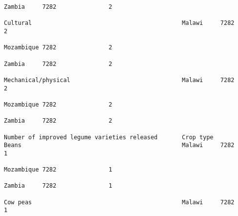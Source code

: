 \documentclass[11pt]{article}
\begin{document}
\begin{Verbatim}[commandchars=\\\{\}]
                                                                                                                                                                                                                 Zambia     7282               2  
                                                                                                                                                              Cultural                                           Malawi     7282               2  
                                                                                                                                                                                                                 Mozambique 7282               2  
                                                                                                                                                                                                                 Zambia     7282               2  
                                                                                                                                                              Mechanical/physical                                Malawi     7282               2  
                                                                                                                                                                                                                 Mozambique 7282               2  
                                                                                                                                                                                                                 Zambia     7282               2  
                                                                         Number of improved legume varieties released       Crop type                         Beans                                              Malawi     7282               1  
                                                                                                                                                                                                                 Mozambique 7282               1  
                                                                                                                                                                                                                 Zambia     7282               1  
                                                                                                                                                              Cow peas                                           Malawi     7282               1  

\end{Verbatim}
\end{document}
